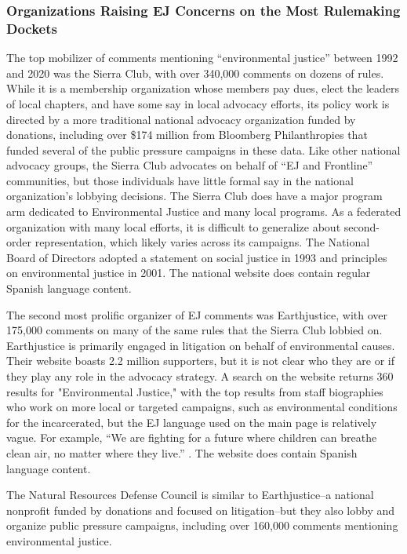\documentclass[
      12pt,
        ]{article}
\begin{document}
\hypertarget{organizations-raising-ej-concerns-on-the-most-rulemaking-dockets}{%
\subsubsection{Organizations Raising EJ Concerns on the Most Rulemaking Dockets}\label{organizations-raising-ej-concerns-on-the-most-rulemaking-dockets}}

The top mobilizer of comments mentioning ``environmental justice'' between 1992 and 2020 was the Sierra Club, with over 340,000 comments on dozens of rules. While it is a membership organization whose members pay dues, elect the leaders of local chapters, and have some say in local advocacy efforts, its policy work is directed by a more traditional national advocacy organization funded by donations, including over \$174 million from Bloomberg Philanthropies that funded several of the public pressure campaigns in these data. Like other national advocacy groups, the Sierra Club advocates on behalf of ``EJ and Frontline'' communities, but those individuals have little formal say in the national organization's lobbying decisions. The Sierra Club does have a major program arm dedicated to Environmental Justice and many local programs. As a federated organization with many local efforts, it is difficult to generalize about second-order representation, which likely varies across its campaigns. The National Board of Directors adopted a statement on social justice in 1993 and principles on environmental justice in 2001. The national website does contain regular Spanish language content.

The second most prolific organizer of EJ comments was Earthjustice, with over 175,000 comments on many of the same rules that the Sierra Club lobbied on. Earthjustice is primarily engaged in litigation on
behalf of environmental causes. Their website boasts 2.2 million
supporters, but it is not clear who they are or if they play any role in
the advocacy strategy. A search on the website returns 360 results for
"Environmental Justice," with the top results from staff biographies
who work on more local or targeted campaigns, such as environmental conditions
for the incarcerated, but the EJ language used on the
main page is relatively vague. For example, ``We are fighting for a future
where children can breathe clean air, no matter where they live.''
\citep{Earthjustice2017}. The website does contain Spanish language content.

The Natural Resources Defense Council is similar to Earthjustice--a
national nonprofit funded by donations and focused on litigation--but
they also lobby and organize public pressure campaigns, including over 160,000 comments mentioning environmental justice.
\end{document}
